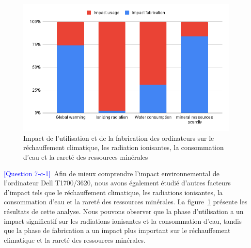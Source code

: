 \documentclass[12pt,a4paper]{paper}
\begin{document}
\begin{figure}[H]%
    \centering
    \includegraphics[width=\linewidth]{img/graph-other.png}
    \caption{Impact de l'utilisation et de la fabrication des ordinateurs sur le réchauffement climatique, les radiation ionisantes, la consommation d'eau et la rareté des ressources minérales}
    \label{fig:other-impact}
\end{figure}
\textcolor{blue}{[Question 7-c-1]}~Afin de mieux comprendre l'impact environnemental de l'ordinateur Dell T1700/3620, nous avons également étudié d'autres facteurs d'impact tels que le réchauffement climatique, les radiations ionisantes, la consommation d'eau et la rareté des ressources minérales. La figure~\ref{fig:other-impact} présente les résultats de cette analyse. Nous pouvons observer que la phase d'utilisation a un impact significatif sur les radiations ionisantes et la consommation d'eau, tandis que la phase de fabrication a un impact plus important sur le réchauffement climatique et la rareté des ressources minérales.
    
\end{document}
